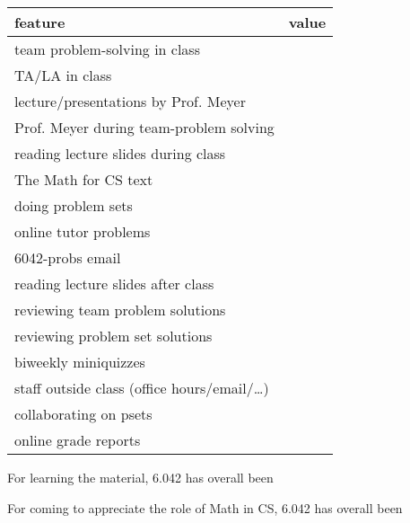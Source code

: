 \documentclass[handout]{mcs}
\begin{document}
\iffalse
 How helpful have the following aspects of the course been in
achieving the subject outcomes for you personally:
\fi

\begin{center}

\begin{tabular}{| l | c |}
\hline
\hspace{1in} feature &  value\\  %
\hline  \hline
   team problem-solving in class  & \\   \hline
   TA/LA in class        & \\  \hline
   lecture/presentations by Prof. Meyer  & \\  \hline
   Prof. Meyer during team-problem solving &\\ \hline
   reading lecture slides during class    & \\  \hline
   The Math for CS text          & \\  \hline
   doing problem sets          & \\  \hline
   online tutor problems & \\  \hline
   6042-probs email      &\\ \hline
   reading lecture slides after class     & \\  \hline
   reviewing team problem solutions       & \\  \hline
   reviewing problem set solutions & \\  \hline
   biweekly miniquizzes                   & \\  \hline
   staff outside class (office hours/email/\dots) & \\  \hline
   collaborating on psets                 & \\  \hline
   online grade reports                   & \\  \hline
\end{tabular}
\end{center}

For learning the material, 6.042 has overall been  \hfill \brule{0.5in}

For coming to appreciate the role of
Math in CS, 6.042 has overall been \hfill \brule{0.5in}
\end{document}
